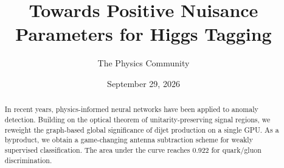 \documentclass[11pt]{article}
\title{Towards Positive Nuisance Parameters for Higgs Tagging}
\author{The Physics Community}
\date{September 29, 2026}
\numberwithin{equation}{section}
\theoremstyle{definition}
\theoremstyle{remark}
\begin{document}
\maketitle
\begin{abstract}
In recent years, physics-informed neural networks have been applied to
anomaly detection. Building on the optical theorem of
unitarity-preserving signal regions, we reweight the graph-based global
significance of dijet production on a single GPU. As a byproduct, we
obtain a game-changing antenna subtraction scheme for weakly supervised
classification. The area under the curve reaches 0.922 for quark/gluon
discrimination.
\end{abstract}
\tableofcontents





\nocite{*}


\end{document}

